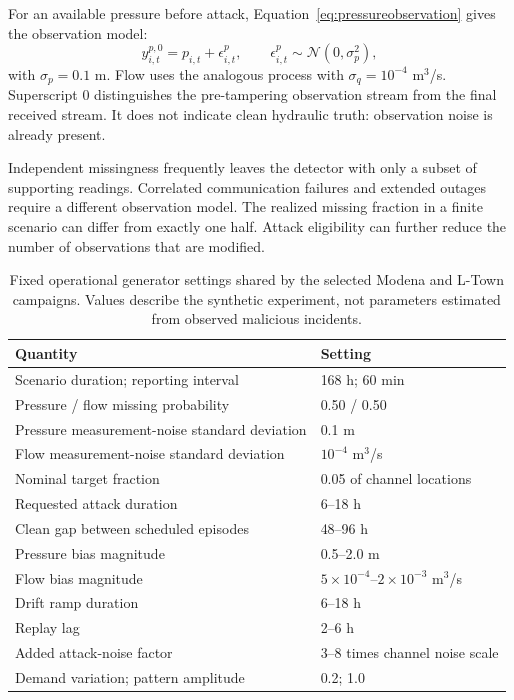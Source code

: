 For an available pressure before attack, Equation~\eqref{eq:pressureobservation} gives the observation model:
\begin{equation}
 y^{p,0}_{i,t}=p_{i,t}+\epsilon^p_{i,t},
 \qquad \epsilon^p_{i,t}\sim\mathcal N(0,\sigma_p^2),\label{eq:pressureobservation}
\end{equation}
with $\sigma_p=0.1$ m. Flow uses the analogous process with $\sigma_q=10^{-4}$ m$^3$/s. Superscript $0$ distinguishes the pre-tampering observation stream from the final received stream. It does not indicate clean hydraulic truth: observation noise is already present.

Independent missingness frequently leaves the detector with only a subset of supporting readings. Correlated communication failures and extended outages require a different observation model. The realized missing fraction in a finite scenario can differ from exactly one half. Attack eligibility can further reduce the number of observations that are modified.

\begin{table}[tbp]
\centering\small
\caption[Fixed operational generator settings shared by the selected Modena and L-Town campaigns]{Fixed operational generator settings shared by the selected Modena and L-Town campaigns. Values describe the synthetic experiment, not parameters estimated from observed malicious incidents.}
\label{tab:generator}
\begin{tabularx}{\linewidth}{@{}Yl@{}}
\toprule
Quantity & Setting\\
\midrule
Scenario duration; reporting interval & 168 h; 60 min\\
Pressure / flow missing probability & 0.50 / 0.50\\
Pressure measurement-noise standard deviation & 0.1 m\\
Flow measurement-noise standard deviation & $10^{-4}$ m$^3$/s\\
Nominal target fraction & 0.05 of channel locations\\
Requested attack duration & 6--18 h\\
Clean gap between scheduled episodes & 48--96 h\\
Pressure bias magnitude & 0.5--2.0 m\\
Flow bias magnitude & $5\times10^{-4}$--$2\times10^{-3}$ m$^3$/s\\
Drift ramp duration & 6--18 h\\
Replay lag & 2--6 h\\
Added attack-noise factor & 3--8 times channel noise scale\\
Demand variation; pattern amplitude & 0.2; 1.0\\
\bottomrule
\end{tabularx}
\end{table}

